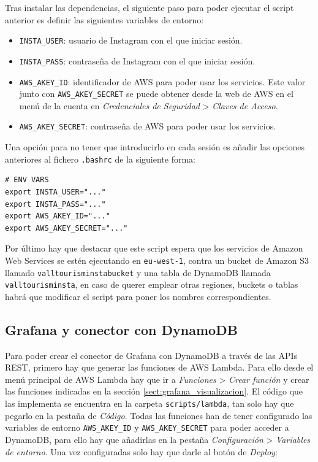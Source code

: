 Tras instalar las dependencias, el siguiente paso para poder ejecutar el script anterior es definir las siguientes variables de entorno:

\begin{itemize}
    \item \texttt{INSTA\_USER}: usuario de Instagram con el que iniciar sesión.
    \item \texttt{INSTA\_PASS}: contraseña de Instagram con el que iniciar sesión.
    \item \texttt{AWS\_AKEY\_ID}: identificador de AWS para poder usar los servicios. Este valor junto con \texttt{AWS\_AKEY\_SECRET} se puede obtener desde la web de AWS en el menú de la cuenta en \textit{Credenciales de Seguridad} > \textit{Claves de Acceso}.
    \item \texttt{AWS\_AKEY\_SECRET}: contraseña de AWS para poder usar los servicios.
\end{itemize}

Una opción para no tener que introducirlo en cada sesión es añadir las opciones anteriores al fichero \texttt{.bashrc} de la siguiente forma:

\begin{verbatim}
# ENV VARS
export INSTA_USER="..."
export INSTA_PASS="..."
export AWS_AKEY_ID="..."
export AWS_AKEY_SECRET="..."
\end{verbatim}

Por último hay que destacar que este script espera que los servicios de Amazon Web Services se estén ejecutando en \texttt{eu-west-1}, contra un bucket de Amazon S3 llamado \texttt{valltourisminstabucket} y una tabla de DynamoDB llamada \texttt{valltourisminsta}, en caso de querer emplear otras regiones, buckets o tablas habrá que modificar el script para poner los nombres correspondientes.

\subsection{Grafana y conector con DynamoDB}

Para poder crear el conector de Grafana con DynamoDB a través de las APIs REST, primero hay que generar las funciones de AWS Lambda. Para ello desde el menú principal de AWS Lambda hay que ir a \textit{Funciones} > \textit{Crear función} y crear las funciones indicadas en la sección \ref{sect:grafana_visualizacion}. El código que las implementa se encuentra en la carpeta \texttt{scripts/lambda}, tan solo hay que pegarlo en la pestaña de \textit{Código}. Todas las funciones han de tener configurado las variables de entorno \texttt{AWS\_AKEY\_ID} y \texttt{AWS\_AKEY\_SECRET} para poder acceder a DynamoDB, para ello hay que añadirlas en la pestaña \textit{Configuración} > \textit{Variables de entorno}. Una vez configuradas solo hay que darle al botón de \textit{Deploy}:

